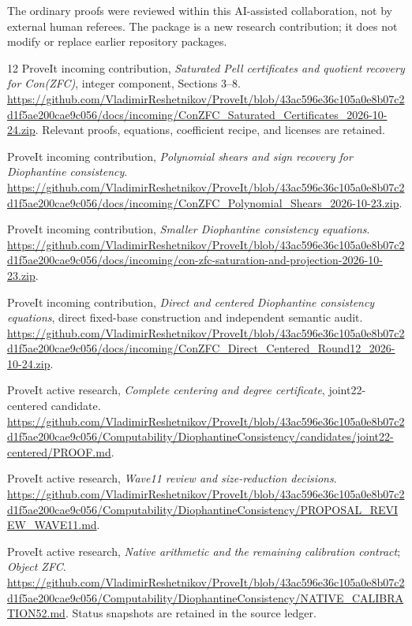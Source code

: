 \documentclass[11pt,letterpaper]{article}
\theoremstyle{remark}\newtheorem{remark}[theorem]{Remark}
\begin{document}
The ordinary proofs were reviewed within this AI-assisted collaboration,
not by external human referees. The package is a new research contribution;
it does not modify or replace earlier repository packages.

\begin{thebibliography}{12}\small
{}
ProveIt incoming contribution,
\emph{Saturated Pell certificates and quotient recovery for Con(ZFC)},
integer component, Sections 3--8.
\url{https://github.com/VladimirReshetnikov/ProveIt/blob/43ac596e36c105a0e8b07c2d1f5ae200cae9c056/docs/incoming/ConZFC_Saturated_Certificates_2026-10-24.zip}.
Relevant proofs, equations, coefficient recipe, and licenses are retained.

ProveIt incoming contribution,
\emph{Polynomial shears and sign recovery for Diophantine consistency}.
\url{https://github.com/VladimirReshetnikov/ProveIt/blob/43ac596e36c105a0e8b07c2d1f5ae200cae9c056/docs/incoming/ConZFC_Polynomial_Shears_2026-10-23.zip}.

ProveIt incoming contribution,
\emph{Smaller Diophantine consistency equations}.
\url{https://github.com/VladimirReshetnikov/ProveIt/blob/43ac596e36c105a0e8b07c2d1f5ae200cae9c056/docs/incoming/con-zfc-saturation-and-projection-2026-10-23.zip}.

ProveIt incoming contribution,
\emph{Direct and centered Diophantine consistency equations},
direct fixed-base construction and independent semantic audit.
\url{https://github.com/VladimirReshetnikov/ProveIt/blob/43ac596e36c105a0e8b07c2d1f5ae200cae9c056/docs/incoming/ConZFC_Direct_Centered_Round12_2026-10-24.zip}.

ProveIt active research, \emph{Complete centering and degree certificate},
joint22-centered candidate.
\url{https://github.com/VladimirReshetnikov/ProveIt/blob/43ac596e36c105a0e8b07c2d1f5ae200cae9c056/Computability/DiophantineConsistency/candidates/joint22-centered/PROOF.md}.

ProveIt active research, \emph{Wave11 review and size-reduction decisions}.
\url{https://github.com/VladimirReshetnikov/ProveIt/blob/43ac596e36c105a0e8b07c2d1f5ae200cae9c056/Computability/DiophantineConsistency/PROPOSAL_REVIEW_WAVE11.md}.

ProveIt active research, \emph{Native arithmetic and the remaining
calibration contract}; \emph{Object ZFC}.
\url{https://github.com/VladimirReshetnikov/ProveIt/blob/43ac596e36c105a0e8b07c2d1f5ae200cae9c056/Computability/DiophantineConsistency/NATIVE_CALIBRATION52.md}.
Status snapshots are retained in the source ledger.


\end{thebibliography}
\end{document}
